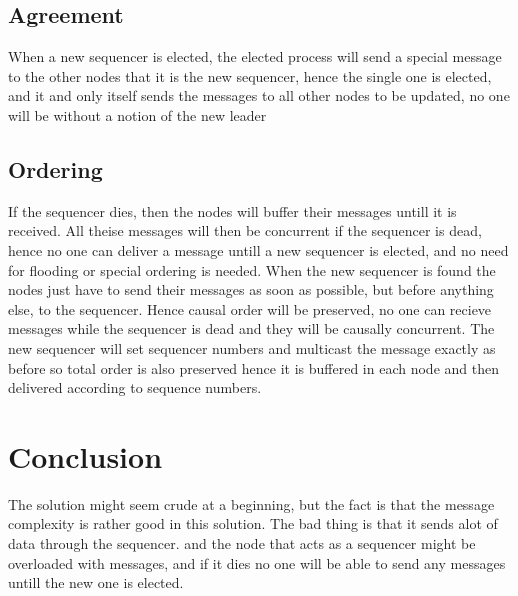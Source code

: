 \documentclass{article}
\begin{document}
  \subsection{Agreement}
    When a new sequencer is elected, the elected process will send a special message to the other nodes
    that it is the new sequencer, hence the single one is elected, and it and only itself sends the 
    messages to all other nodes to be updated, no one will be without a notion of the new leader

  \subsection{Ordering}
    If the sequencer dies, then the nodes will buffer their messages untill it is received. 
    All theise messages will then be concurrent if the sequencer is dead, hence no one can 
    deliver a message untill a new sequencer is elected, and no need for flooding or special
    ordering is needed. When the new sequencer is found the nodes just have to send their messages as soon
    as possible, but before anything else, to the sequencer. Hence causal order will be preserved, no one
    can recieve messages while the sequencer is dead and they will be causally concurrent. The new sequencer
    will set sequencer numbers and multicast the message exactly as before so total order is also preserved
    hence it is buffered in each node and then delivered according to sequence numbers.
    
\section{Conclusion}
  The solution might seem crude at a beginning, but the fact is that the message complexity
  is rather good in this solution. The bad thing is that it sends alot of data through the 
  sequencer. and the node that acts as a sequencer might be overloaded with messages, and if 
  it dies no one will be able to send any messages untill the new one is elected.
\end{document}
